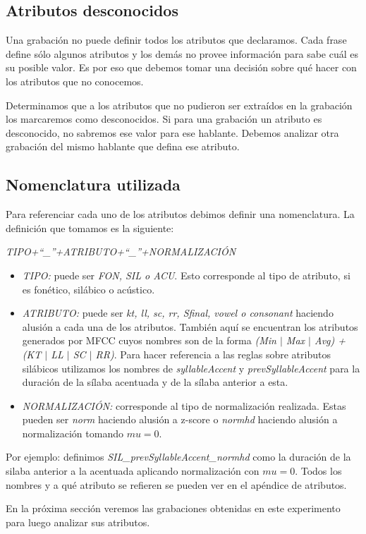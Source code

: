 \subsection{Atributos desconocidos}

Una grabación no puede definir todos los atributos que declaramos. Cada frase define sólo algunos atributos y los demás no provee información para sabe cuál es su posible valor. Es por eso que debemos tomar una decisión sobre qué hacer con los atributos que no conocemos. 

Determinamos que a los atributos que no pudieron ser extraídos en la grabación los marcaremos como desconocidos. Si para una grabación un atributo es desconocido, no sabremos ese valor para ese hablante. Debemos analizar otra grabación del mismo hablante que defina ese atributo.

\subsection{Nomenclatura utilizada}
Para referenciar cada uno de los atributos debimos definir una nomenclatura. La definición que tomamos es la siguiente:
\begin{center}
\textit{TIPO+``\_''+ATRIBUTO+``\_''+NORMALIZACIÓN} 
\end{center}

\begin{itemize}
  \item \emph{TIPO:} puede ser \emph{FON, SIL o ACU}. Esto corresponde al tipo de atributo, si es fonético, silábico o acústico.
  \item \emph{ATRIBUTO:} puede ser \emph{kt, ll, sc, rr, Sfinal, vowel o consonant} haciendo alusión a cada una de los atributos. También aquí se encuentran los atributos generados por MFCC cuyos nombres son de la forma \emph{(Min $|$ Max $|$ Avg) + (KT $|$ LL $|$ SC $|$ RR)}. Para hacer referencia a las reglas sobre atributos silábicos utilizamos los nombres de \emph{syllableAccent} y \emph{prevSyllableAccent} para la duración de la sílaba acentuada y de la sílaba anterior a esta.
  \item \emph{NORMALIZACIÓN:} corresponde al tipo de normalización realizada. Estas pueden ser \emph{norm} haciendo alusión a z-score o \emph{normhd} haciendo alusión a normalización tomando $mu=0$.
\end{itemize}
 
Por ejemplo: definimos \textit{SIL\_prevSyllableAccent\_normhd} como la duración de la silaba anterior a la acentuada aplicando normalización con $mu=0$. Todos los nombres y a qué atributo se refieren se pueden ver en el apéndice de atributos.

En la próxima sección veremos las grabaciones obtenidas en este experimento para luego analizar sus atributos.
